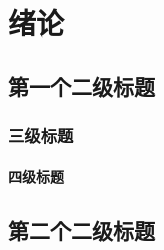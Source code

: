 \chapter{绪论}
    \section{第一个二级标题}
        \subsection{三级标题}
            \subsubsection{四级标题}
    \section{第二个二级标题}